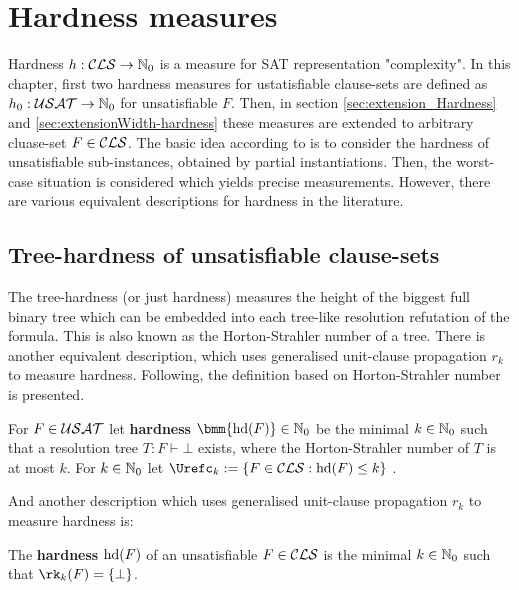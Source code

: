 \documentclass[12pt]{book}
\begin{document}
\chapter{Hardness measures}
\label{cha:Hardness Measures}

Hardness $h :\mathcal{CLS} \rightarrow \mathbb{N}_0$ is a measure for SAT representation "complexity". In this chapter, first two hardness 
measures for ustatisfiable clause-sets are defined as $ h_0 : \mathcal{USAT} \rightarrow \mathbb{N}_0$ for unsatisfiable $F$.
Then, in section \ref{sec:extension_Hardness} and \ref{sec:extensionWidth-hardness} these measures are extended to arbitrary 
cluase-set $F \in \mathcal{CLS}$. The basic idea according to \cite{h20} is to consider the hardness 
of unsatisfiable sub-instances, obtained by partial instantiations. Then, the worst-case situation is considered which yields 
precise measurements. However, there are various equivalent descriptions for hardness in the literature. 

\section{Tree-hardness of unsatisfiable clause-sets}
\label{sec:Hardnessunsat}

The tree-hardness (or just hardness) measures the height of the biggest full binary tree which can be embedded into each tree-like resolution 
refutation of the formula. This is also known as the Horton-Strahler number of a tree. There is another equivalent description, 
which uses generalised unit-clause propagation $r_k$ to measure hardness. Following, the definition based on Horton-Strahler number is presented.

\begin{defi}\label{def:hardness1}
      \cite{h5} For $F \in \mathcal{USAT}$ let \textbf{hardness} $\bmm{\hardness(F)} \in \NNZ$ be the minimal $k \in \mathbb{N}_0$ such that a resolution tree $T : F \vdash \bot$ 
	  exists, where the Horton-Strahler number of $T$ is at most $k$. For $k \in \mathbb{N}_0$ let $\Urefc_k  := \{F \in \Cls : \hardness(F) \leq k\}$ .
\end{defi}
And another description which uses generalised unit-clause propagation $r_k$ to measure hardness is:
\begin{defi}\label{def:hardness2}
  \cite{h13} The \textbf{hardness} $\operatorname{hd}(F)$ of an unsatisfiable $F \in \mathcal{CLS}$ is the minimal $k \in \mathbb{N}_0$ such that $\rk_k(F) = \set{\bot}$.
\end{defi}
\end{document}
